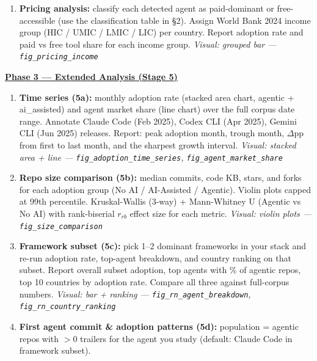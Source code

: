 \documentclass[9pt,a4paper]{article}
\begin{document}
\begin{enumerate}[leftmargin=1.5em,itemsep=1pt,topsep=2pt]
        Also report 2 mutually exclusive framework combinations (e.g.\ React+Next.js
        vs React+Express) with the same breakdown.
        \textit{Visual: horizontal bar --- \texttt{fig\_framework\_adoption}}
  \item \textbf{Pricing analysis:} classify each detected agent as paid-dominant or
        free-accessible (use the classification table in \S 2). Assign World Bank 2024
        income group (HIC / UMIC / LMIC / LIC) per country. Report adoption rate and
        paid vs free tool share for each income group.
        \textit{Visual: grouped bar --- \texttt{fig\_pricing\_income}}
\end{enumerate}

\vspace{4pt}
\noindent\textbf{\underline{Phase 3 --- Extended Analysis (Stage 5)}}
\begin{enumerate}[leftmargin=1.5em,itemsep=1pt,topsep=2pt]
  \item \textbf{Time series (5a):} monthly adoption rate (stacked area chart, agentic +
        ai\_assisted) and agent market share (line chart) over the full corpus date range.
        Annotate Claude Code (Feb 2025), Codex CLI (Apr 2025), Gemini CLI (Jun 2025) releases.
        Report: peak adoption month, trough month, $\Delta$pp from first to last month,
        and the sharpest growth interval.
        \textit{Visual: stacked area + line --- \texttt{fig\_adoption\_time\_series}, \texttt{fig\_agent\_market\_share}}
  \item \textbf{Repo size comparison (5b):} median commits, code KB, stars, and forks for
        each adoption group (No AI / AI-Assisted / Agentic). Violin plots capped at 99th
        percentile. Kruskal-Wallis (3-way) + Mann-Whitney U (Agentic vs No AI) with
        rank-biserial $r_{rb}$ effect size for each metric.
        \textit{Visual: violin plots --- \texttt{fig\_size\_comparison}}
  \item \textbf{Framework subset (5c):} pick 1--2 dominant frameworks in your stack and
        re-run adoption rate, top-agent breakdown, and country ranking on that subset.
        Report overall subset adoption, top agents with \% of agentic repos, top 10
        countries by adoption rate. Compare all three against full-corpus numbers.
        \textit{Visual: bar + ranking --- \texttt{fig\_rn\_agent\_breakdown}, \texttt{fig\_rn\_country\_ranking}}
  \item \textbf{First agent commit \& adoption patterns (5d):} population = agentic repos
        with $>$0 trailers for the agent you study (default: Claude Code in framework subset).

\end{enumerate}
\end{document}
